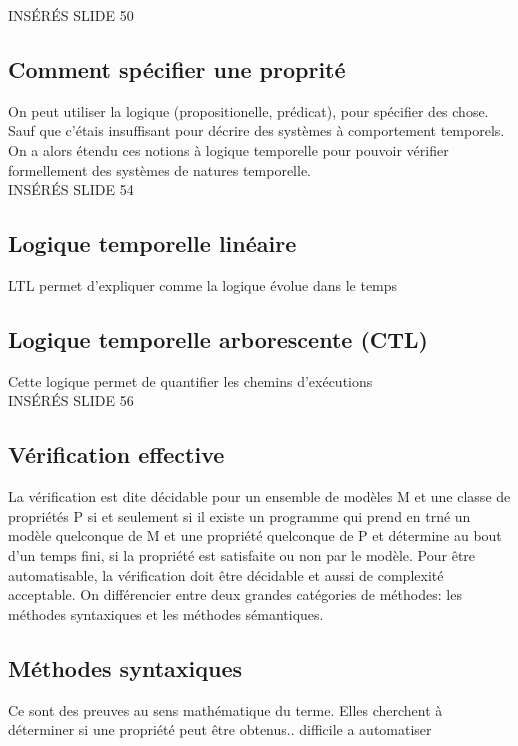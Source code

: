 \documentclass[oneside]{book}
\begin{document}
    INSÉRÉS SLIDE 50\\
    
    \subsection{Comment spécifier une proprité}
    On peut utiliser la logique (propositionelle, prédicat), pour spécifier des chose. Sauf que c'étais insuffisant pour décrire des systèmes à comportement temporels. On a alors étendu ces notions à logique temporelle pour pouvoir vérifier formellement des systèmes de natures temporelle.\\
    
    INSÉRÉS SLIDE 54\\
    
    \subsection{Logique temporelle linéaire}
    LTL permet d'expliquer comme la logique évolue dans le temps\\
    
    \subsection{Logique temporelle arborescente (CTL)}
    Cette logique permet de quantifier les chemins d'exécutions\\
    
    INSÉRÉS SLIDE 56\\
    
    \subsection{Vérification effective}
    La vérification est dite décidable pour un ensemble de modèles M et une classe de propriétés P si et seulement si il existe un programme qui prend en trné un modèle quelconque de M et une propriété quelconque de P et détermine au bout d'un temps fini, si la propriété est satisfaite ou non par le modèle. Pour être automatisable, la vérification doit être décidable et aussi de complexité acceptable. On différencier entre deux grandes catégories de méthodes: les méthodes syntaxiques et les méthodes sémantiques.\\
    
    \subsection{Méthodes syntaxiques}
    Ce sont des preuves au sens mathématique du terme. Elles cherchent à déterminer si une propriété peut être obtenus.. difficile a automatiser\\
    
\end{document}

